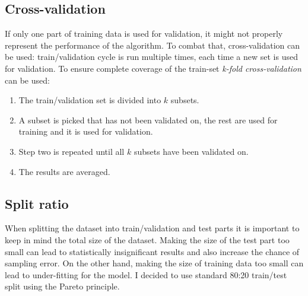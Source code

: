 \documentclass[12pt,a4paper]{book}
\begin{document}
\subsection{Cross-validation}
If only one part of training data is used for validation, it might not properly represent the performance of the algorithm.
To combat that, cross-validation can be used: train/validation cycle is run multiple times, each time a new set is used for validation.
To ensure complete coverage of the train-set \emph{k-fold cross-validation} can be used: 
\begin{enumerate}
\item The train/validation set is divided into $k$ subsets.
\item A subset is picked that has not been validated on, the rest are used for training and it is used for validation.
\item Step two is repeated until all $k$ subsets have been validated on.
\item The results are averaged.
\end{enumerate}

\subsection{Split ratio}
When splitting the dataset into train/validation and test parts it is important to keep in mind the total size of the dataset.
Making the size of the test part too small can lead to statistically insignificant results and also increase the chance of sampling error.
On the other hand, making the size of training data too small can lead to under-fitting for the model.
I decided to use standard 80:20 train/test split using the Pareto principle.
\end{document}
